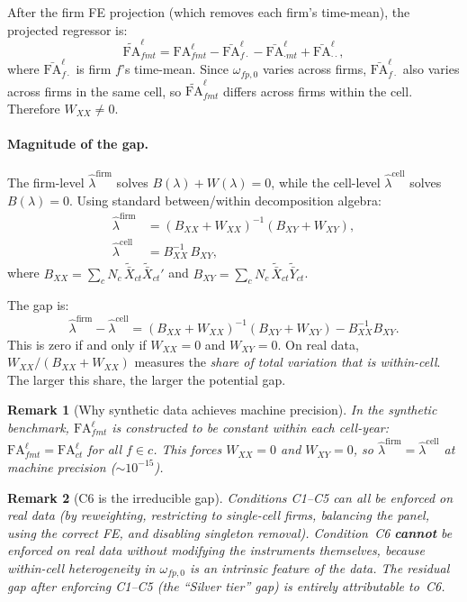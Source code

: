 \documentclass{article}
\newcommand{\FA}{\mathrm{FA}}
\theoremstyle{plain}
\newtheorem{remark}{Remark}
\theoremstyle{definition}
\begin{document}
After the firm FE projection (which removes each firm's time-mean), the
projected regressor is:
\[
  \tilde{\FA}^\ell_{fmt}
  = \FA^\ell_{fmt} - \bar{\FA}^\ell_{f\cdot}
  - \bar{\FA}^\ell_{\cdot mt} + \bar{\FA}^\ell_{\cdot\cdot},
\]
where $\bar{\FA}^\ell_{f\cdot}$ is firm $f$'s time-mean.  Since
$\omega_{fp,0}$ varies across firms, $\bar{\FA}^\ell_{f\cdot}$ also varies
across firms in the same cell, so $\tilde{\FA}^\ell_{fmt}$ differs across
firms within the cell.  Therefore $W_{XX} \neq 0$.

\paragraph{Magnitude of the gap.}

The firm-level $\hat\lambda^\mathrm{firm}$ solves
$B(\lambda) + W(\lambda) = 0$, while the cell-level
$\hat\lambda^\mathrm{cell}$ solves $B(\lambda) = 0$.  Using standard
between/within decomposition algebra:
\begin{align}
  \hat\lambda^\mathrm{firm}
  &= (B_{XX} + W_{XX})^{-1}(B_{XY} + W_{XY}), \label{eq:firm_est} \\
  \hat\lambda^\mathrm{cell}
  &= B_{XX}^{-1}\, B_{XY}, \label{eq:cell_est}
\end{align}
where $B_{XX} = \sum_c N_c\,\tilde{\bar{X}}_{ct}\tilde{\bar{X}}_{ct}'$ and
$B_{XY} = \sum_c N_c\,\tilde{\bar{X}}_{ct}\tilde{\bar{Y}}_{ct}$.

The gap is:
\[
  \hat\lambda^\mathrm{firm} - \hat\lambda^\mathrm{cell}
  = (B_{XX} + W_{XX})^{-1}(B_{XY} + W_{XY}) - B_{XX}^{-1} B_{XY}.
\]
This is zero if and only if $W_{XX} = 0$ and $W_{XY} = 0$.  On real data,
$W_{XX} / (B_{XX} + W_{XX})$ measures the \emph{share of total variation that
is within-cell}.  The larger this share, the larger the potential gap.

\begin{remark}[Why synthetic data achieves machine precision]
In the synthetic benchmark, $\FA^\ell_{fmt}$ is constructed to be constant
within each cell-year: $\FA^\ell_{fmt} = \FA^\ell_{ct}$ for all $f \in c$.
This forces $W_{XX} = 0$ and $W_{XY} = 0$, so
$\hat\lambda^\mathrm{firm} = \hat\lambda^\mathrm{cell}$ at machine precision
($\sim 10^{-15}$).
\end{remark}

\begin{remark}[C6 is the irreducible gap]
Conditions C1--C5 can all be enforced on real data (by reweighting, restricting
to single-cell firms, balancing the panel, using the correct FE, and disabling
singleton removal).  Condition~C6 \textbf{cannot} be enforced on real data
without modifying the instruments themselves, because within-cell heterogeneity
in $\omega_{fp,0}$ is an intrinsic feature of the data.  The residual gap after
enforcing C1--C5 (the ``Silver tier'' gap) is entirely attributable to~C6.
\end{remark}
\end{document}
